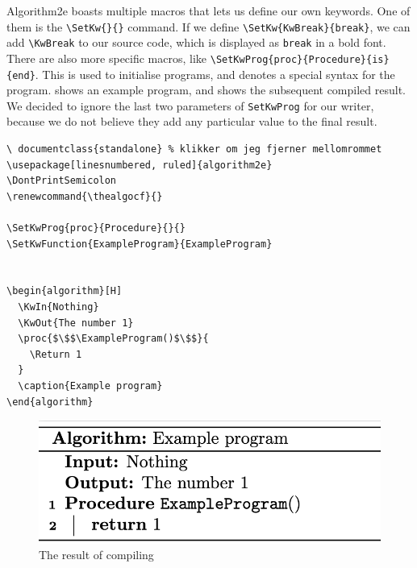 
Algorithm2e boasts multiple macros that lets us define our own keywords. One of them is the \texttt{\textbackslash SetKw\{\}\{\}} command. If we define \texttt{\textbackslash SetKw\{KwBreak\}\{break\}}, we can add \texttt{\textbackslash KwBreak} to our source code, which is displayed as \texttt{break} in a bold font. \\

There are also more specific macros, like \texttt{\textbackslash SetKwProg\{proc\}\{Procedure\}\{is\}\\\{end\}}. This is used to initialise programs, and denotes a special syntax for the program.  shows an example program, and  shows the subsequent compiled result. We decided to ignore the last two parameters of \texttt{SetKwProg} for our writer, because we do not believe they add any particular value to the final result. \\

\begin{lstlisting}[caption={Example program with Algorithm2e to show macros in action.}, captionpos=b, label={Example program with Algorithm2e to show macros in action.}]
\ documentclass{standalone} % klikker om jeg fjerner mellomrommet
\usepackage[linesnumbered, ruled]{algorithm2e}
\DontPrintSemicolon
\renewcommand{\thealgocf}{}

\SetKwProg{proc}{Procedure}{}{}
\SetKwFunction{ExampleProgram}{ExampleProgram}

    
\begin{algorithm}[H]
  \KwIn{Nothing}
  \KwOut{The number 1}
  \proc{$\$$\ExampleProgram()$\$$}{
    \Return 1
  }
  \caption{Example program}
\end{algorithm}

\end{lstlisting}

\begin{figure}[ht]
    \centering
    \includegraphics[scale=0.6]{assets/exampleProgramAlgorithm2e.png}
    \caption{The result of compiling }
    \label{The result of compiling Listing 4.10.}
\end{figure}

